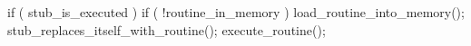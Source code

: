\documentclass[varwidth=20em,crop]{standalone}
\begin{document}
\begin{ccode}
if ( stub_is_executed ){
  if ( !routine_in_memory )
     load_routine_into_memory();
  stub_replaces_itself_with_routine();
  execute_routine();
}  
\end{ccode}
\end{document}
